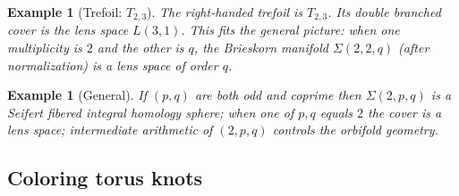 \documentclass[table]{amsart}
\newtheorem{remark}[theorem]{Remark}
\newtheorem{example}[theorem]{Example}
\numberwithin{equation}{section}
\begin{document}


\begin{example}[Trefoil: \(T_{2,3}\)]
The right-handed trefoil is \(T_{2,3}\). Its double branched cover is the lens space \(L(3,1)\). This fits the general picture: when one multiplicity is \(2\) and the other is \(q\), the Brieskorn manifold \(\Sigma(2,2,q)\) (after normalization) is a lens space of order \(q\).
\end{example}

\begin{example}[General]
If \((p,q)\) are both odd and coprime then \(\Sigma(2,p,q)\) is a Seifert fibered integral homology sphere; when one of \(p,q\) equals \(2\) the cover is a lens space; intermediate arithmetic of \((2,p,q)\) controls the orbifold geometry.
\end{example}



\subsection{Coloring torus knots}
\end{document}
